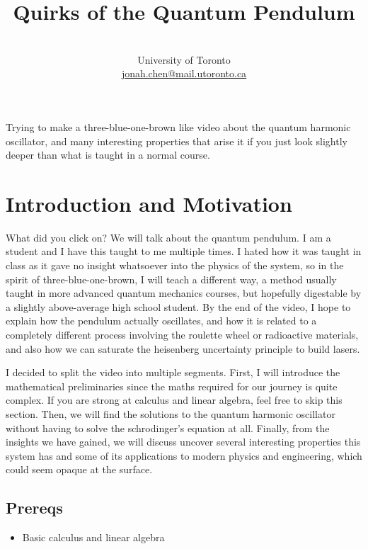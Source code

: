 \documentclass[a4paper]{article}
\title{\vspace{-50pt}\bfseries{\Large{Quirks of the Quantum Pendulum}}\vspace{-5pt}}
\author{\normalfont{Jonah Chen}\\\vspace{-3pt}\small{University of Toronto}\\
\vspace{-10pt}\small{\url{jonah.chen@mail.utoronto.ca}}}
\date{}
\numberwithin{equation}{section}
\begin{document}
\maketitle
\sffamily

Trying to make a three-blue-one-brown like video about the quantum harmonic oscillator, and many interesting properties that arise it if you just look slightly deeper than what is taught in a normal course.

\section{Introduction and Motivation}

\begin{script}
    What did you click on? We will talk about the quantum pendulum. I am a student and I have this taught to me multiple times. I hated how it was taught in class as it gave no insight whatsoever into the physics of the system, so in the spirit of three-blue-one-brown, I will teach a different way, a method usually taught in more advanced quantum mechanics courses, but hopefully digestable by a slightly above-average high school student. By the end of the video, I hope to explain how the pendulum actually oscillates, and how it is related to a completely different process involving the roulette wheel or radioactive materials, and also how we can saturate the heisenberg uncertainty principle to build lasers.
\end{script}

\begin{script}
    I decided to split the video into multiple segments. First, I will introduce the mathematical preliminaries since the maths required for our journey is quite complex. If you are strong at calculus and linear algebra, feel free to skip this section. Then, we will find the solutions to the quantum harmonic oscillator without having to solve the schrodinger's equation at all. Finally, from the insights we have gained, we will discuss uncover several interesting properties this system has and some of its applications to modern physics and engineering, which could seem opaque at the surface.
\end{script}

\subsection{Prereqs}
\begin{itemize}
    \item Basic calculus and linear algebra
\end{itemize}
\end{document}
